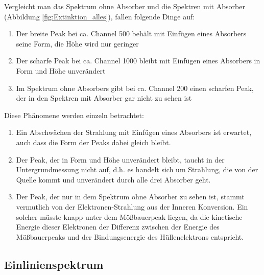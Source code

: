 \documentclass[12pt,a4paper]{article}
\begin{document}
Vergleicht man das Spektrum ohne Absorber und die Spektren mit Absorber (Abbildung \ref{fig:Extinktion_alles}), fallen folgende Dinge auf:
\begin{enumerate}
\item Der breite Peak bei ca. Channel 500 behält mit Einfügen eines Absorbers seine Form, die Höhe wird nur geringer
\item Der scharfe Peak bei ca. Channel 1000 bleibt mit Einfügen eines Absorbers in Form und Höhe unverändert
\item Im Spektrum ohne Absorbers gibt bei ca. Channel 200 einen scharfen Peak, der in den Spektren mit Absorber gar nicht zu sehen ist
\end{enumerate}
Diese Phänomene werden einzeln betrachtet:
\begin{enumerate}
\item Ein Abschwächen der Strahlung mit Einfügen eines Absorbers ist erwartet, auch dass die Form der Peaks dabei gleich bleibt.
\item Der Peak, der in Form und Höhe unverändert bleibt, taucht in der Untergrundmessung nicht auf, d.h. es handelt sich um Strahlung, die von der Quelle kommt und unverändert durch alle drei Absorber geht.
\item Der Peak, der nur in dem Spektrum ohne Absorber zu sehen ist, stammt vermutlich von der Elektronen-Strahlung aus der Inneren Konversion. Ein solcher müsste knapp unter dem Mößbauerpeak liegen, da die kinetische Energie dieser Elektronen der Differenz zwischen der Energie des Mößbauerpeaks und der Bindungsenergie des Hüllenelektrons entspricht.
\end{enumerate}


\subsection{Einlinienspektrum}
\end{document}

